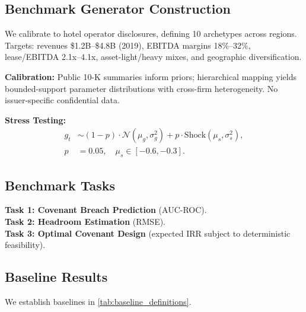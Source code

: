 \documentclass[11pt,a4paper]{article}
\numberwithin{equation}{section}
\theoremstyle{plain}
\theoremstyle{definition}
\begin{document}
\subsection{Benchmark Generator Construction}

We calibrate to hotel operator disclosures, defining 10 archetypes across regions. Targets: revenues \$1.2B--\$4.8B (2019), EBITDA margins 18\%--32\%, lease/EBITDA 2.1x--4.1x, asset-light/heavy mixes, and geographic diversification.

\textbf{Calibration:} Public 10-K summaries inform priors; hierarchical mapping yields bounded-support parameter distributions with cross-firm heterogeneity. No issuer-specific confidential data.

\textbf{Stress Testing:}
\begin{align}
g_t &\sim (1-p)\cdot \mathcal{N}(\mu_g,\sigma_g^2) + p\cdot \text{Shock}(\mu_s,\sigma_s^2), \\
p&=0.05,\quad \mu_s\in[-0.6,-0.3].
\end{align}

\subsection{Benchmark Tasks}

\textbf{Task 1: Covenant Breach Prediction} (AUC-ROC). \\
\textbf{Task 2: Headroom Estimation} (RMSE). \\
\textbf{Task 3: Optimal Covenant Design} (expected IRR subject to deterministic feasibility).

\subsection{Baseline Results}

We establish baselines in \cref{tab:baseline_definitions}.
\end{document}
